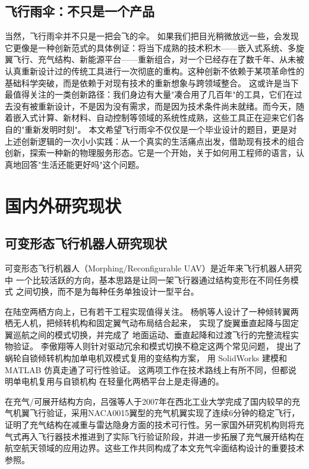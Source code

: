 \subsection{飞行雨伞：不只是一个产品}

  当然，飞行雨伞并不只是一把会飞的伞。
  如果我们把目光稍微放远一些，会发现它更像是一种创新范式的具体例证：将当下成熟的技术积木——嵌入式系统、多旋翼飞行、充气结构、新能源平台——重新组合，对一个已经存在了数千年、从未被认真重新设计过的传统工具进行一次彻底的重构。这种创新不依赖于某项革命性的基础科学突破，而是依赖于对现有技术的重新想象与跨领域整合。
  这或许是当下最值得关注的一类创新路径：我们身边有大量"凑合用了几百年"的工具，它们在过去没有被重新设计，不是因为没有需求，而是因为技术条件尚未就绪。而今天，随着嵌入式计算、新材料、自动控制等领域的系统性成熟，这些工具正在迎来它们各自的"重新发明时刻"。
  本文希望飞行雨伞不仅仅是一个毕业设计的题目，更是对上述创新逻辑的一次小小实践：从一个真实的生活痛点出发，借助现有技术的组合创新，探索一种新的物理服务形态。它是一个开始，关于如何用工程师的语言，认真地回答"生活还能更好吗"这个问题。

\section{国内外研究现状}

\subsection{可变形态飞行机器人研究现状}

可变形态飞行机器人（Morphing/Reconfigurable UAV）是近年来飞行机器人研究中
一个比较活跃的方向，基本思路是让同一架飞行器通过结构变形在不同任务模式
之间切换，而不是为每种任务单独设计一型平台。

在陆空两栖方向上，已有若干工程实现值得关注。
杨帆等人设计了一种倾转翼两栖无人机，把倾转机构和固定翼气动布局结合起来，
实现了旋翼垂直起降与固定翼巡航之间的模式切换，并完成了
地面运动、垂直起降和过渡飞行的完整流程实物验证\cite{yangfan2021}。
李傲翔等人则针对驱动冗余和模式切换不稳定这两个常见问题，
提出了蜗轮自锁倾转机构加单电机双模式复用的变结构方案，
用 SolidWorks 建模和 MATLAB 仿真走通了可行性验证\cite{liaoxiang2025}。
这两项工作在技术路线上有所不同，但都说明单电机复用与自锁机构
在轻量化两栖平台上是走得通的。

在充气/可展开结构方向，吕强等人于2007年在西北工业大学完成了国内较早的充气机翼飞行验证，采用NACA0015翼型的充气机翼实现了连续6分钟的稳定飞行，证明了充气结构在减重与雷达隐身方面的技术可行性\cite{lvqiang2007}。另一家国外研究机构则将充气式再入飞行器技术推进到了实际飞行验证阶段，并进一步拓展了充气展开结构在航空航天领域的应用边界。这些工作共同构成了本文充气伞面结构设计的重要技术参照。


